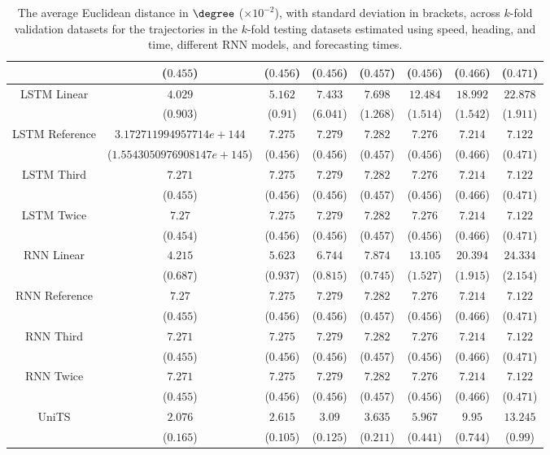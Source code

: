 \begin{table}[!ht]
{\begin{tabular}{|c|c|c|c|c|c|c|c|}
			 & ($0.455$) & ($0.456$) & ($0.456$) & ($0.457$) & ($0.456$) & ($0.466$) & ($0.471$) \\ \hline
			\multirow{2}{*}{LSTM Linear} & $4.029$ & $5.162$ & $7.433$ & $7.698$ & $12.484$ & $18.992$ & $22.878$ \\
			 & ($0.903$) & ($0.91$) & ($6.041$) & ($1.268$) & ($1.514$) & ($1.542$) & ($1.911$) \\ \hline
			\multirow{2}{*}{LSTM Reference} & $3.172711994957714e+144$ & $7.275$ & $7.279$ & $7.282$ & $7.276$ & $7.214$ & $7.122$ \\
			 & ($1.5543050976908147e+145$) & ($0.456$) & ($0.456$) & ($0.457$) & ($0.456$) & ($0.466$) & ($0.471$) \\ \hline
			\multirow{2}{*}{LSTM Third} & $7.271$ & $7.275$ & $7.279$ & $7.282$ & $7.276$ & $7.214$ & $7.122$ \\
			 & ($0.455$) & ($0.456$) & ($0.456$) & ($0.457$) & ($0.456$) & ($0.466$) & ($0.471$) \\ \hline
			\multirow{2}{*}{LSTM Twice} & $7.27$ & $7.275$ & $7.279$ & $7.282$ & $7.276$ & $7.214$ & $7.122$ \\
			 & ($0.454$) & ($0.456$) & ($0.456$) & ($0.457$) & ($0.456$) & ($0.466$) & ($0.471$) \\ \hline
			\multirow{2}{*}{RNN Linear} & $4.215$ & $5.623$ & $6.744$ & $7.874$ & $13.105$ & $20.394$ & $24.334$ \\
			 & ($0.687$) & ($0.937$) & ($0.815$) & ($0.745$) & ($1.527$) & ($1.915$) & ($2.154$) \\ \hline
			\multirow{2}{*}{RNN Reference} & $7.27$ & $7.275$ & $7.279$ & $7.282$ & $7.276$ & $7.214$ & $7.122$ \\
			 & ($0.455$) & ($0.456$) & ($0.456$) & ($0.457$) & ($0.456$) & ($0.466$) & ($0.471$) \\ \hline
			\multirow{2}{*}{RNN Third} & $7.271$ & $7.275$ & $7.279$ & $7.282$ & $7.276$ & $7.214$ & $7.122$ \\
			 & ($0.455$) & ($0.456$) & ($0.456$) & ($0.457$) & ($0.456$) & ($0.466$) & ($0.471$) \\ \hline
			\multirow{2}{*}{RNN Twice} & $7.271$ & $7.275$ & $7.279$ & $7.282$ & $7.276$ & $7.214$ & $7.122$ \\
			 & ($0.455$) & ($0.456$) & ($0.456$) & ($0.457$) & ($0.456$) & ($0.466$) & ($0.471$) \\ \hline
			\multirow{2}{*}{UniTS} & $2.076$ & $2.615$ & $3.09$ & $3.635$ & $5.967$ & $9.95$ & $13.245$ \\
			 & ($0.165$) & ($0.105$) & ($0.125$) & ($0.211$) & ($0.441$) & ($0.744$) & ($0.99$) \\ \hline
		\end{tabular}
	}
	\caption{The average Euclidean distance in $\degree$ ($\times 10^{-2}$), with standard deviation in brackets, across $k$-fold validation datasets for the trajectories in the $k$-fold testing datasets estimated using speed, heading, and time, different RNN models, and forecasting times.}
	\label{tab:all_speed_actual_dir_euclid}
\end{table}

